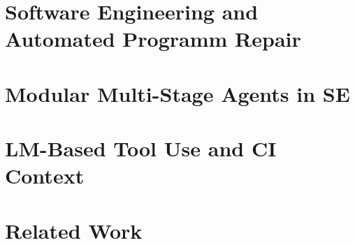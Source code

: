 \section{Software Engineering and Automated Programm Repair}

\section{Modular Multi-Stage Agents in SE}

\section{LM-Based Tool Use and CI Context}

\section{Related Work}

